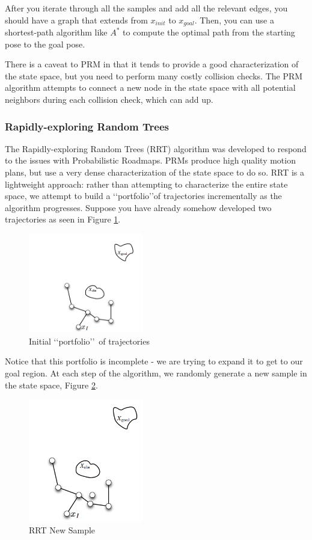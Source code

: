 \documentclass[twoside]{article}
\begin{document}
After you iterate through all the samples and add all the relevant edges, you should have a graph that extends from $x_{init}$ to $x_{goal}$. Then, you can use a shortest-path algorithm like $A^*$ to compute the optimal path from the starting pose to the goal pose.

There is a caveat to PRM in that it tends to provide a good characterization of the state space, but you need to perform many costly collision checks. The PRM algorithm attempts to connect a new node in the state space with all potential neighbors during each collision check, which can add up.

\subsubsection{Rapidly-exploring Random Trees}
The Rapidly-exploring Random Trees (RRT) algorithm was developed to respond to the issues with Probabilistic Roadmaps. PRMs produce high quality motion plans, but use a very dense characterization of the state space to do so. RRT is a lightweight approach: rather than attempting to characterize the entire state space, we attempt to build a \lq\lq portfolio\rq\rq of trajectories incrementally as the algorithm progresses. Suppose you have already somehow developed two trajectories as seen in Figure \ref{fig:rrt_portfolio}.

\begin{figure}[h!]
  \centering
  \includegraphics[width=50mm]{rrt_portfolio_of_trajectories.png}
  \caption{Initial \lq\lq portfolio\rq\rq\ of trajectories}
  \label{fig:rrt_portfolio}
\end{figure}

Notice that this portfolio is incomplete - we are trying to expand it to get to our goal region. At each step of the algorithm, we randomly generate a new sample in the state space, Figure \ref{fig:rrt_new_sample}.

\begin{figure}[h!]
  \centering
  \includegraphics[width=50mm]{rrt_new_sample.png}
  \caption{RRT New Sample}
  \label{fig:rrt_new_sample}
\end{figure}
\end{document}
